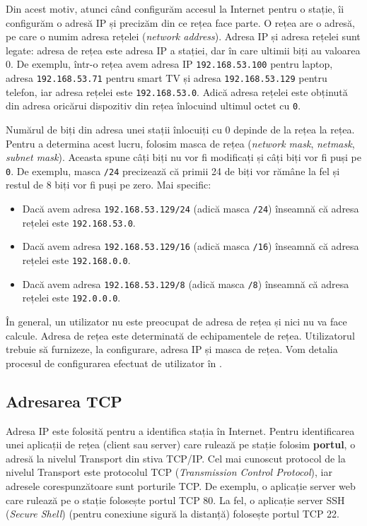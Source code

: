 Din acest motiv, atunci când configurăm accesul la Internet pentru o stație, îi configurăm o adresă IP și precizăm din ce rețea face parte.
O rețea are o adresă, pe care o numim adresa rețelei (\textit{network address}).
Adresa IP și adresa rețelei sunt legate: adresa de rețea este adresa IP a stației, dar în care ultimii biți au valoarea 0.
De exemplu, într-o rețea avem adresa IP \texttt{192.168.53.100} pentru laptop, adresa \texttt{192.168.53.71} pentru smart TV și adresa \texttt{192.168.53.129} pentru telefon, iar adresa rețelei este \texttt{192.168.53.0}.
Adică adresa rețelei este obținută din adresa oricărui dispozitiv din rețea înlocuind ultimul octet cu \texttt{0}.

Numărul de biți din adresa unei stații înlocuiți cu 0 depinde de la rețea la rețea.
Pentru a determina acest lucru, folosim masca de rețea (\textit{network mask}, \textit{netmask}, \textit{subnet mask}).
Aceasta spune câți biți nu vor fi modificați și câți biți vor fi puși pe \texttt{0}.
De exemplu, masca \texttt{/24} precizează că primii 24 de biți vor rămâne la fel și restul de 8 biți vor fi puși pe zero.
Mai specific:

\begin{itemize}
  \item Dacă avem adresa \texttt{192.168.53.129/24} (adică masca \texttt{/24}) înseamnă că adresa rețelei este \texttt{192.168.53.0}.
  \item Dacă avem adresa \texttt{192.168.53.129/16} (adică masca \texttt{/16}) înseamnă că adresa rețelei este \texttt{192.168.0.0}.
  \item Dacă avem adresa \texttt{192.168.53.129/8} (adică masca \texttt{/8}) înseamnă că adresa rețelei este \texttt{192.0.0.0}.
\end{itemize}

În general, un utilizator nu este preocupat de adresa de rețea și nici nu va face calcule.
Adresa de rețea este determinată de echipamentele de rețea.
Utilizatorul trebuie să furnizeze, la configurare, adresa IP și masca de rețea.
Vom detalia procesul de configurarea efectuat de utilizator în .

\subsection{Adresarea TCP}
\label{sec:net:tcp-ip:tcp-address}

Adresa IP este folosită pentru a identifica stația în Internet.
Pentru identificarea unei aplicații de rețea (client sau server) care rulează pe stație folosim \textbf{portul}, o adresă la nivelul Transport din stiva TCP/IP.
Cel mai cunoscut protocol de la nivelul Transport este protocolul TCP  (\textit{Transmission Control Protocol}), iar adresele corespunzătoare sunt porturile TCP.
De exemplu, o aplicație server web care rulează pe o stație folosește portul TCP 80. La fel, o aplicație server SSH (\textit{Secure Shell}) (pentru conexiune sigură la distanță) folosește portul TCP 22.

